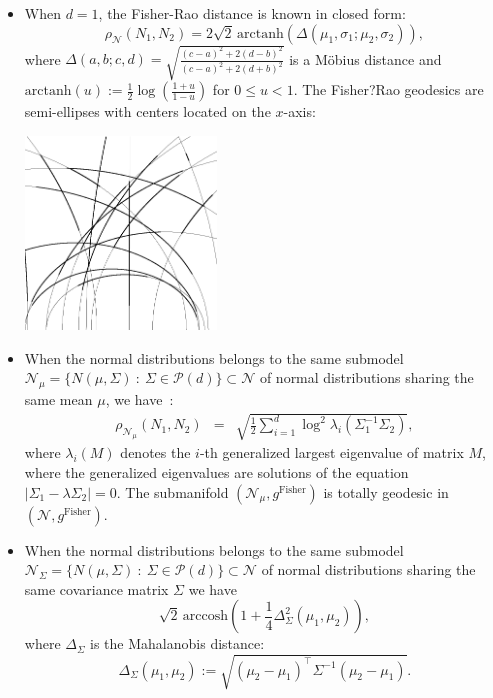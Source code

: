 \documentclass{article}
\def\arccosh{\mathrm{arccosh}}
\def\arctanh{\mathrm{arctanh}}
\def\Fisher{\mathrm{Fisher}}
\def\calN{\mathcal{N}}
\def\calP{\mathcal{P}}
\def\st{\ :\ }
\begin{document}
\begin{itemize}

\item When $d=1$, the Fisher-Rao distance is known in closed form:
$$
\rho_{\calN}(N_1,N_2)= 2\sqrt{2}\,\arctanh(\Delta(\mu_1,\sigma_1;\mu_2,\sigma_2)),
$$
where $\Delta(a,b;c,d)=\sqrt{\frac{(c-a)^2+2(d-b)^2}{(c-a)^2+2(d+b)^2}}$ is a M\"obius distance and $\arctanh(u):=\frac{1}{2}\log\left(\frac{1+u}{1-u}\right)$ for $0\leq u<1$.
The Fisher?Rao geodesics are semi-ellipses with centers located on the $x$-axis:

\begin{center}
\includegraphics[width=0.4\textwidth]{FisherRaoGeodesics1D.png} 
\end{center}

\item When the normal distributions belongs to the same submodel $\calN_\mu=\{N(\mu,\Sigma)\st \Sigma\in\calP(d)\}\subset\calN$ of normal distributions sharing the same mean $\mu$, we have~\cite{DoubleCone-James-1973,Skovgaard-1984}:  
\begin{eqnarray*}
\rho_{\calN_\mu}(N_1,N_2)&=& \sqrt{\frac{1}{2} \sum_{i=1}^d \log^2 \lambda_i(\Sigma_1^{-1}\Sigma_2)},
\end{eqnarray*}
where $\lambda_i(M)$ denotes the $i$-th generalized largest eigenvalue of matrix $M$, where the generalized eigenvalues are solutions of the equation $|\Sigma_1-\lambda\Sigma_2|=0$. The submanifold $(\calN_\mu,g^\Fisher)$ is totally geodesic in $(\calN,g^\Fisher)$.

\item When the normal distributions belongs to the same submodel 
$\calN_\Sigma=\{N(\mu,\Sigma)\st \Sigma\in\calP(d)\}\subset\calN$ of normal distributions sharing the same covariance matrix $\Sigma$
we have
$$
\sqrt{2}\, \arccosh\left(1+\frac{1}{4}\Delta_\Sigma^2(\mu_1,\mu_2)\right),
$$
where $\Delta_\Sigma$ is the Mahalanobis distance:
$$
\Delta_\Sigma(\mu_1,\mu_2):=\sqrt{(\mu_2-\mu_1)^\top \Sigma^{-1} (\mu_2-\mu_1)}.
$$
\end{itemize}
\end{document}

